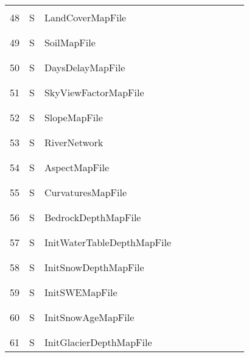 \begin{longtable}{|c|c|l|c|c|c|c|p{}|c|p{}|}
&&&&&&&&&\\
48 & S & LandCoverMapFile & & & & & & & \\
&&&&&&&&&\\\hline%
&&&&&&&&&\\
49 & S & SoilMapFile & & & & & & & \\
&&&&&&&&&\\\hline%
&&&&&&&&&\\
50 & S & DaysDelayMapFile & & & & & & & \\
&&&&&&&&&\\\hline%
&&&&&&&&&\\
51 & S & SkyViewFactorMapFile & & & & & & & \\
&&&&&&&&&\\\hline%
&&&&&&&&&\\
52 & S & SlopeMapFile & & & & & & & \\
&&&&&&&&&\\\hline%
&&&&&&&&&\\
53 & S & RiverNetwork & & & & & & & \\
&&&&&&&&&\\\hline%
&&&&&&&&&\\
54 & S & AspectMapFile & & & & & & & \\
&&&&&&&&&\\\hline%
&&&&&&&&&\\
55 & S & CurvaturesMapFile & & & & & & & \\
&&&&&&&&&\\\hline%
&&&&&&&&&\\
56 & S & BedrockDepthMapFile & & & & & & & \\
&&&&&&&&&\\\hline%
&&&&&&&&&\\
57 & S & InitWaterTableDepthMapFile & & & & & & & \\
&&&&&&&&&\\\hline%
&&&&&&&&&\\
58 & S & InitSnowDepthMapFile & & & & & & & \\
&&&&&&&&&\\\hline%
&&&&&&&&&\\
59 & S & InitSWEMapFile & & & & & & & \\
&&&&&&&&&\\\hline%
&&&&&&&&&\\
60 & S & InitSnowAgeMapFile & & & & & & & \\
&&&&&&&&&\\\hline%
&&&&&&&&&\\
61 & S & InitGlacierDepthMapFile & & & & & & & \\

\end{longtable}
